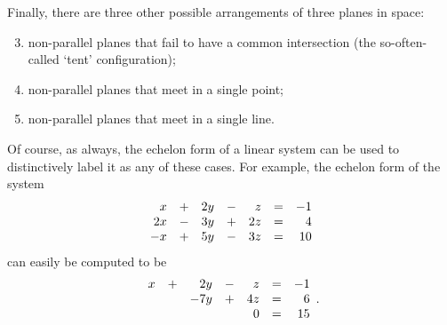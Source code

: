 Finally, there are three other possible arrangements of three planes in space:
\begin{enumerate}
 \setcounter{enumi}{2}
 \item non-parallel planes that fail to have a common intersection (the
  so-often-called `tent' configuration);
 \item non-parallel planes that meet in a single point;
 \item non-parallel planes that meet in a single line.
\end{enumerate}
Of course, as always, the echelon form of a linear system can be used to
distinctively label it as any of these cases. For example, the echelon form of
the system
\begin{equation}
 \label{eq:tent}
 \begin{array}{r c r c r c r}
  x & + & 2y & - & z & = & -1\\
  2x & - & 3y & + & 2z & = & 4\\
  -x & + & 5y & - & 3z & = & 10
 \end{array}
\end{equation}
can easily be computed to be
\[
 \begin{array}{r c r c r c r}
  x & + & 2y & - & z & = & -1\\
    & & -7y & + & 4z & = & 6\\
    & & & & 0 & = & 15
 \end{array}.
\]

